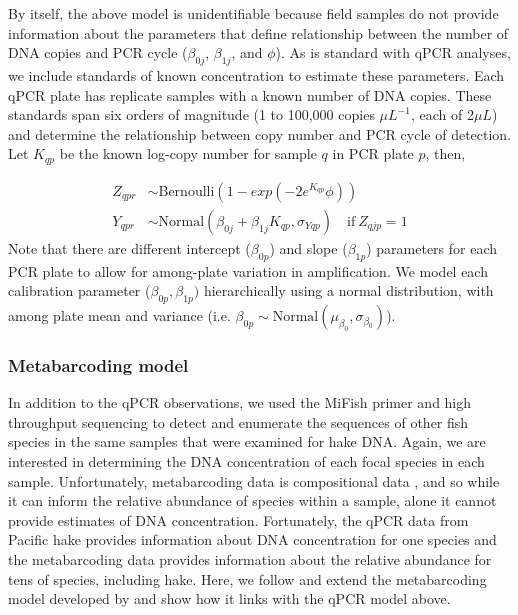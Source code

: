 \documentclass{article}
\begin{document}
By itself, the above model is unidentifiable because field samples do not provide information about the parameters that define relationship between the number of DNA copies and PCR cycle ($\beta_{0j}$, $\beta_{1j}$, and $\phi$). As is standard with qPCR analyses, we include standards of known concentration to estimate these parameters. Each qPCR plate has replicate samples with a known number of DNA copies. These standards span six orders of magnitude (1 to 100,000 copies $\mu L^{-1}$, each of 2$\mu L$) and determine the relationship between copy number and PCR cycle of detection. Let $K_{qp}$ be the known log-copy number for sample $q$ in PCR plate $p$, then,

\begin{align}
  Z_{qpr} &\sim  \mathrm{Bernoulli} \left(1-exp(-2 e^{K_{qp}} \phi) \right)\\
  Y_{qpr} &\sim  \mathrm{Normal} \left(\beta_{0j}+\beta_{1j}{K_{qp}},\sigma_{Yqp}\right) \quad  \mathrm{if} \: Z_{qjp} =1
\end{align}
Note that there are different intercept ($\beta_{0p}$) and slope ($\beta_{1p}$) parameters for each PCR plate to allow for among-plate variation in amplification. We model each calibration parameter ($\beta_{0p},\beta_{1p})$ hierarchically using a normal distribution, with among plate mean and variance (i.e. $\beta_{0p} \sim \mathrm{Normal}(\mu_{\beta_{0}},\sigma_{\beta_{0}})$).

\subsubsection*{Metabarcoding model}

In addition to the qPCR observations, we used the MiFish primer and high throughput sequencing to detect and enumerate the sequences of other fish species in the same samples that were examined for hake DNA. Again, we are interested in determining the DNA concentration of each focal species in each sample. Unfortunately, metabarcoding data is compositional data \cite{shelton2023}, and so while it can inform the relative abundance of species within a sample, alone it cannot provide estimates of DNA concentration. Fortunately, the qPCR data from Pacific hake provides information about DNA concentration for one species and the metabarcoding data provides information about the relative abundance for tens of species, including hake. Here, we follow and extend the metabarcoding model developed by \cite{shelton2023} and show how it links with the qPCR model above. 
\end{document}
